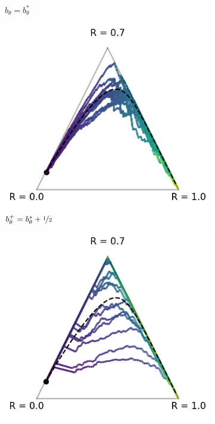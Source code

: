 \begin{figure}[t]
\begin{subfigure}[b]{0.24\linewidth}
    \caption{$b_\theta = b^*_\theta$}
    \label{fig:0}
  \end{subfigure}
  \hfill
  \begin{subfigure}[b]{0.24\linewidth}
    \includegraphics[width=\textwidth]{articles/baselines/figs/reproduced_simplex_npg/natural_minvar_05.png}
    \caption{$b^+_\theta = b^*_\theta + \nicefrac{1}{2}$}
    \label{fig:1}
  \end{subfigure}
  \hfill
  \begin{subfigure}[b]{0.24\linewidth}
    \includegraphics[width=\textwidth]{articles/baselines/figs/reproduced_simplex_npg/natural_value_00.png}

\end{subfigure}
\end{figure}
